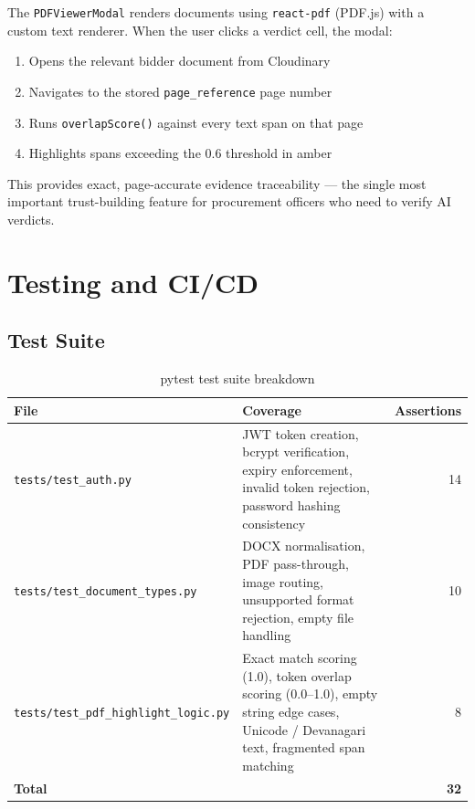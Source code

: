\documentclass[12pt,a4paper]{article}
\begin{document}
The \texttt{PDFViewerModal} renders documents using \texttt{react-pdf} (PDF.js)
with a custom text renderer. When the user clicks a verdict cell, the modal:
\begin{enumerate}
\item Opens the relevant bidder document from Cloudinary
\item Navigates to the stored \texttt{page\_reference} page number
\item Runs \texttt{overlapScore()} against every text span on that page
\item Highlights spans exceeding the 0.6 threshold in amber
\end{enumerate}

This provides exact, page-accurate evidence traceability — the single most
important trust-building feature for procurement officers who need to verify
AI verdicts.

\section{Testing and CI/CD}

\subsection{Test Suite}

\begin{table}[H]
\centering
\begin{tabularx}{\linewidth}{@{}lXr@{}}
\toprule
\textbf{File} & \textbf{Coverage} & \textbf{Assertions} \\
\midrule
\texttt{tests/test\_auth.py} &
    JWT token creation, bcrypt verification, expiry enforcement,
    invalid token rejection, password hashing consistency &
    14 \\[4pt]
\texttt{tests/test\_document\_types.py} &
    DOCX normalisation, PDF pass-through, image routing,
    unsupported format rejection, empty file handling &
    10 \\[4pt]
\texttt{tests/test\_pdf\_highlight\_logic.py} &
    Exact match scoring (1.0), token overlap scoring (0.0--1.0),
    empty string edge cases, Unicode / Devanagari text,
    fragmented span matching &
    8 \\
\midrule
\textbf{Total} & & \textbf{32} \\
\bottomrule
\end{tabularx}
\caption{pytest test suite breakdown}
\end{table}
\end{document}
